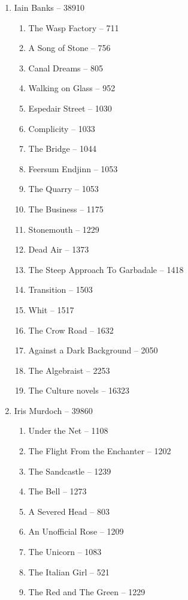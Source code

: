 \documentclass[a4paper, 11pt]{proc} %
\begin{document}
\begin{enumerate}
    \item Iain Banks -- 38910
        \begin{enumerate}
            \item The Wasp Factory -- 711
            \item A Song of Stone -- 756
            \item Canal Dreams -- 805
            \item Walking on Glass -- 952
            \item Espedair Street -- 1030
            \item Complicity -- 1033
            \item The Bridge -- 1044
            \item Feersum Endjinn -- 1053
            \item The Quarry -- 1053
            \item The Business -- 1175
            \item Stonemouth -- 1229
            \item Dead Air -- 1373
            \item The Steep Approach To Garbadale -- 1418
            \item Transition -- 1503
            \item Whit -- 1517
            \item The Crow Road -- 1632
            \item Against a Dark Background -- 2050
            \item The Algebraist -- 2253
            \item The Culture novels -- 16323
        \end{enumerate}
    \item Iris Murdoch -- 39860
        \begin{enumerate}
            \item Under the Net -- 1108
            \item The Flight From the Enchanter -- 1202
            \item The Sandcastle -- 1239
            \item The Bell -- 1273
            \item A Severed Head -- 803
            \item An Unofficial Rose -- 1209
            \item The Unicorn -- 1083
            \item The Italian Girl -- 521
            \item The Red and The Green -- 1229

\end{enumerate}
\end{enumerate}
\end{document}
